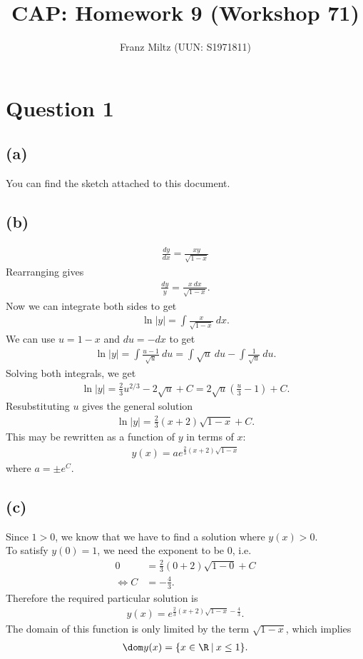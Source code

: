 \documentclass{article}
\title{CAP: Homework 9 (Workshop 71)}
\author{Franz Miltz (UUN: S1971811)}
\begin{document}
\maketitle
\section*{Question 1}
\subsection*{(a)}
You can find the sketch attached to this document.
\subsection*{(b)}
\begin{align*}
	\frac{dy}{dx}=\frac{xy}{\sqrt{1-x}}
\end{align*}
Rearranging gives
\begin{align*}
	\frac{dy}{y}=\frac{x\:dx}{\sqrt{1-x}}.
\end{align*}
Now we can integrate both sides to get
\begin{align*}
	\ln|y| = \int \frac{x}{\sqrt{1-x}}\:dx.
\end{align*}
We can use $u=1-x$ and $du=-dx$ to get
\begin{align*}
	\ln|y| = \int \frac{u-1}{\sqrt{u}}\:du=\int \sqrt{u}\:du - \int \frac{1}{\sqrt{u}}\:du.
\end{align*}
Solving both integrals, we get
\begin{align*}
	\ln|y|=\frac{2}{3}u^{2/3}-2\sqrt{u}+C=2\sqrt{u}\left(\frac{u}{3}-1\right)+C.
\end{align*}
Resubstituting $u$ gives the general solution
\begin{align*}
	\ln|y|=\frac{2}{3}(x+2)\sqrt{1-x}+C.
\end{align*}
This may be rewritten as a function of $y$ in terms of $x$:
\begin{align*}
	y(x)=  ae^{\frac{2}{3}(x+2)\sqrt{1-x}}
\end{align*}
where $a=\pm e^C$.
\subsection*{(c)}
Since $1>0$, we know that we have to find a solution where $y(x)>0$.\\
To satisfy $y(0)=1$, we need the exponent to be $0$, i.e.
\begin{align*}
	0                 & =\frac{2}{3}(0+2)\sqrt{1-0}+C \\
	\Leftrightarrow C & = -\frac{4}{3}.
\end{align*}
Therefore the required particular solution is
\begin{align*}
	y(x)=e^{\frac{2}{3}(x+2)\sqrt{1-x}-\frac{4}{3}}.
\end{align*}
The domain of this function is only limited by the term $\sqrt{1-x}$, which implies \begin{align*}
	\dom y(x) = \{x\in\R\:|\: x\leq 1\}.
\end{align*}
\end{document}
